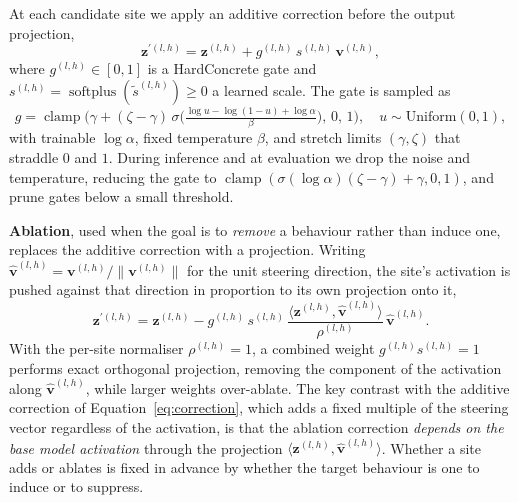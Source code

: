 \documentclass[logo,msc,notimes]{infthesis}
\begin{document}
At each candidate site we apply an additive correction before the output projection,
\begin{equation}\label{eq:correction}
    \mathbf{z}^{\prime(l,h)} = \mathbf{z}^{(l,h)} + g^{(l,h)} \, s^{(l,h)} \, \mathbf{v}^{(l,h)},
\end{equation}
where $g^{(l,h)} \in [0,1]$ is a HardConcrete gate and $s^{(l,h)} = \operatorname{softplus}(\tilde
s^{(l,h)}) \ge 0$ a learned scale. The gate is sampled as
\begin{equation}
    g = \operatorname{clamp}\!\Big(\gamma + (\zeta - \gamma)\,\sigma\!\big(\tfrac{\log u - \log(1-u)
    + \log\alpha}{\beta}\big),\, 0,\, 1\Big), \quad u \sim \mathrm{Uniform}(0,1),
\end{equation}
with trainable $\log\alpha$, fixed temperature $\beta$, and stretch limits $(\gamma,\zeta)$ that
straddle $0$ and $1$. During inference and at evaluation we drop the noise and temperature, reducing the gate to
$\operatorname{clamp}(\sigma(\log\alpha)(\zeta-\gamma)+\gamma,0,1)$, and prune gates below a
small threshold.

\textbf{Ablation}, used when the goal is to \emph{remove} a behaviour rather than induce one, replaces
the additive correction with a projection. Writing $\hat{\mathbf{v}}^{(l,h)} =
\mathbf{v}^{(l,h)}/\lVert\mathbf{v}^{(l,h)}\rVert$ for the unit steering direction, the site's
activation is pushed against that direction in proportion to its own projection onto it,
\begin{equation}\label{eq:ablation}
    \mathbf{z}^{\prime(l,h)} = \mathbf{z}^{(l,h)} - g^{(l,h)} \, s^{(l,h)} \,
    \frac{\langle \mathbf{z}^{(l,h)}, \hat{\mathbf{v}}^{(l,h)}\rangle}{\rho^{(l,h)}} \,
    \hat{\mathbf{v}}^{(l,h)}.
\end{equation}
With the per-site normaliser $\rho^{(l,h)} = 1$, a combined weight $g^{(l,h)}s^{(l,h)} = 1$ performs
exact orthogonal projection, removing the component of the activation along $\hat{\mathbf{v}}^{(l,h)}$,
while larger weights over-ablate. The key contrast with the additive correction of
Equation~\ref{eq:correction}, which adds a fixed multiple of the steering vector regardless of the
activation, is that the ablation correction \emph{depends on the base model activation} through the
projection $\langle \mathbf{z}^{(l,h)}, \hat{\mathbf{v}}^{(l,h)}\rangle$. Whether a site adds or
ablates is fixed in advance by whether the target behaviour is one to induce or to suppress.
\end{document}
